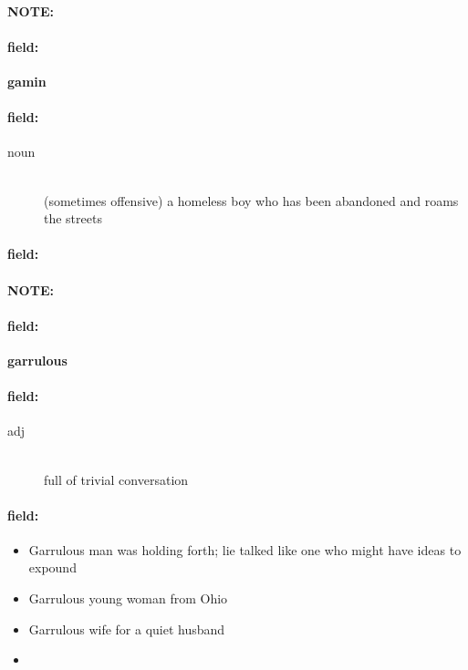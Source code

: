 \documentclass[12pt]{article}
\newenvironment{note}{\paragraph{NOTE:}}{}
\newenvironment{field}{\paragraph{field:}}{}
\begin{document}
\begin{note}
\begin{field}
\textbf{\large gamin}
\end{field}


\begin{field}
\begin{description}
\item[noun] \hfill \\ 
(sometimes offensive) a homeless boy who has been abandoned and roams the streets

\end{description}
\end{field}

\begin{field}
\end{field}
\end{note}
\begin{note}
\begin{field}
\textbf{\large garrulous}
\end{field}


\begin{field}
\begin{description}
\item[adj] \hfill \\ 
full of trivial conversation

\end{description}
\end{field}

\begin{field}
\begin{itemize}
\item Garrulous man was holding forth; lie talked like one who might have ideas to expound
\item Garrulous young woman from Ohio
\item Garrulous wife for a quiet husband
\item 
\end{itemize}
\end{field}
\end{note}
\end{document}
